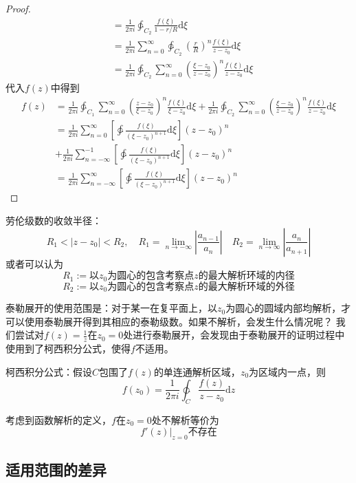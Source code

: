 \documentclass[12pt, a4paper, oneside]{ctexart}
\def\D{\mathrm{d}}
\newcommand{\F}[1][z]
{\ensuremath{f(#1)}}
\begin{document}
\begin{proof}
\begin{align*}
         & = \frac{1}{2\pi i} \ointctrclockwise_{C_2} \frac{\F[\xi]}{1-r/R}\D \xi                                                          \\
         & =\frac{1}{2\pi i} \sum_{n=0}^\infty \ointctrclockwise_{C_2} \left(\frac{r}{R}\right)^n  \frac{\F[\xi]}{z-z_0} \D \xi            \\
         & = \frac{1}{2\pi i} \ointctrclockwise_{C_2} \sum_{n=0}^\infty \left(\frac{\xi-z_0}{z-z_0}\right)^n  \frac{\F[\xi]}{z-z_0} \D \xi
    \end{align*}
    代入$\F$中得到
    \begin{align*}
        \F & =\frac{1}{2\pi i} \ointctrclockwise_{C_1} \sum_{n=0}^\infty  \left(\frac{z-z_0}{\xi-z_0}\right)^n  \frac{\F[\xi]}{\xi-z_0} \D \xi
        + \frac{1}{2\pi i} \ointctrclockwise_{C_2} \sum_{n=0}^\infty \left(\frac{\xi-z_0}{z-z_0}\right)^n  \frac{\F[\xi]}{z-z_0} \D \xi        \\
           & = \frac{1}{2\pi i}  \sum_{n=0}^\infty \left[\ointctrclockwise \frac{\F[\xi]}{(\xi-z_0)^{n+1}}\D \xi \right](z-z_0)^n              \\
           & +\frac{1}{2\pi i}  \sum_{n=-\infty}^{-1} \left[\ointctrclockwise \frac{\F[\xi]}{(\xi-z_0)^{n+1}}\D \xi\right](z-z_0)^n            \\
           & = \frac{1}{2\pi i}  \sum_{n=-\infty}^\infty \left[\ointctrclockwise \frac{\F[\xi]}{(\xi-z_0)^{n+1}}\D \xi \right](z-z_0)^n
    \end{align*}
\end{proof}
劳伦级数的收敛半径：
$$
    R_1<|z-z_0|<R_2,\quad R_1=\lim_{n\to -\infty} \left| \frac{a_{n-1}}{a_n} \right|\quad R_2=\lim_{n \to \infty} \left| \frac{a_n}{a_{n+1}} \right|
$$
或者可以认为
$$R_1 := \text{以$z_0$为圆心的包含考察点$z$的最大解析环域的内径}$$
$$R_2 := \text{以$z_0$为圆心的包含考察点$z$的最大解析环域的外径}$$

泰勒展开的使用范围是：对于某一在复平面上，以$z_0$为圆心的圆域内部均解析，才可以使用泰勒展开得到其相应的泰勒级数。如果不解析，会发生什么情况呢？
我们尝试对$f(z)=\frac{1}{z}$在$z_0=0$处进行泰勒展开，会发现由于泰勒展开的证明过程中使用到了柯西积分公式，使得$f$不适用。

柯西积分公式：假设$C$包围了$\F$的单连通解析区域，$z_0$为区域内一点，则
$$\F[z_0]=\frac{1}{2\pi i}\ointctrclockwise_C \frac{\F}{z-z_0}\D z$$

考虑到函数解析的定义，$f$在$z_0=0$处不解析等价为
$$
    \left. f'(z) \right|_{z=0} \text{不存在}
$$

\subsection{适用范围的差异}
\end{document}
